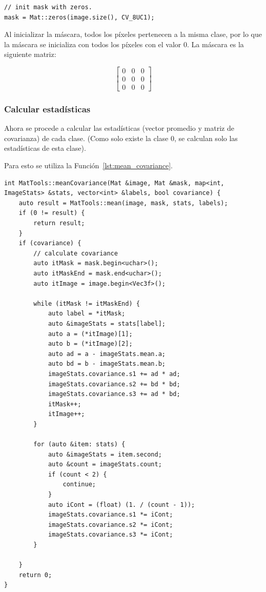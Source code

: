 \begin{lstlisting}[float=H,caption={Compilation},label={lst:init_mask}]
// init mask with zeros.
mask = Mat::zeros(image.size(), CV_8UC1);
\end{lstlisting}

Al inicializar la máscara, todos los píxeles pertenecen a la misma clase, por lo que la máscara se inicializa con todos los píxeles con el valor 0.
La máscara es la siguiente matriz:

\begin{equation*}
    \begin{bmatrix}
        0 & 0 & 0 \\
        0 & 0 & 0 \\
        0 & 0 & 0
    \end{bmatrix}
\end{equation*}

\subsubsection{Calcular estadísticas}\label{subsubsec:calculate-statistics}

Ahora se procede a calcular las estadísticas (vector promedio y matriz de covarianza) de cada clase.
(Como solo existe la clase 0, se calculan solo las estadísticas de esta clase).


Para esto se utiliza la Función~\ref{lst:mean_covariance}.
\begin{lstlisting}[float=H,caption={Mean And Covariance},label={lst:mean_covariance}]
int MatTools::meanCovariance(Mat &image, Mat &mask, map<int, ImageStats> &stats, vector<int> &labels, bool covariance) {
    auto result = MatTools::mean(image, mask, stats, labels);
    if (0 != result) {
        return result;
    }
    if (covariance) {
        // calculate covariance
        auto itMask = mask.begin<uchar>();
        auto itMaskEnd = mask.end<uchar>();
        auto itImage = image.begin<Vec3f>();

        while (itMask != itMaskEnd) {
            auto label = *itMask;
            auto &imageStats = stats[label];
            auto a = (*itImage)[1];
            auto b = (*itImage)[2];
            auto ad = a - imageStats.mean.a;
            auto bd = b - imageStats.mean.b;
            imageStats.covariance.s1 += ad * ad;
            imageStats.covariance.s2 += bd * bd;
            imageStats.covariance.s3 += ad * bd;
            itMask++;
            itImage++;
        }

        for (auto &item: stats) {
            auto &imageStats = item.second;
            auto &count = imageStats.count;
            if (count < 2) {
                continue;
            }
            auto iCont = (float) (1. / (count - 1));
            imageStats.covariance.s1 *= iCont;
            imageStats.covariance.s2 *= iCont;
            imageStats.covariance.s3 *= iCont;
        }

    }
    return 0;
}
\end{lstlisting}

